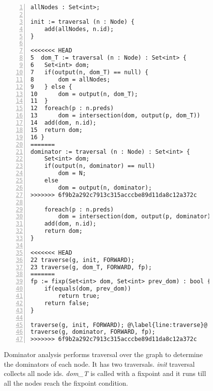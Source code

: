 \begin{figure}[ht!]
\centering
\begin{lstlisting}[numbers=left, tabsize=4, escapechar=@]
allNodes : Set<int>;

init := traversal (n : Node) { 
	add(allNodes, n.id);
}

<<<<<<< HEAD
5  dom_T := traversal (n : Node) : Set<int> { 
6 	Set<int> dom;
7	if(output(n, dom_T) == null) {
8		dom = allNodes;
9	} else {
10		dom = output(n, dom_T);
11	}
12	foreach(p : n.preds) 
13		dom = intersection(dom, output(p, dom_T)) 
14	add(dom, n.id); 
15	return dom; 
16 } 
=======
dominator := traversal (n : Node) : Set<int> { 
	Set<int> dom;
	if(output(n, dominator) == null)
		dom = N;
	else
		dom = output(n, dominator);
>>>>>>> 6f9b2a292c7913c315acccbe89d11da8c12a372c

	foreach(p : n.preds) 
		dom = intersection(dom, output(p, dominator)) 
	add(dom, n.id); 
	return dom; 
} 

<<<<<<< HEAD
22 traverse(g, init, FORWARD); 
23 traverse(g, dom_T, FORWARD, fp); 				
=======
fp := fixp(Set<int> dom, Set<int> prev_dom) : bool {
	if(equals(dom, prev_dom))
		return true;
	return false;
}

traverse(g, init, FORWARD); @\label{line:traverse}@
traverse(g, dominator, FORWARD, fp); 				
>>>>>>> 6f9b2a292c7913c315acccbe89d11da8c12a372c
\end{lstlisting}
\caption{Dominator analysis performs traversal over the graph to determine the dominators of each node. It has two traversals. \textit{init} traversal collects all node ids. \textit{dom\_T} is called with a fixpoint and it runs till all the nodes reach the fixpoint condition.}
\label{fig:dominator}
\end{figure}


